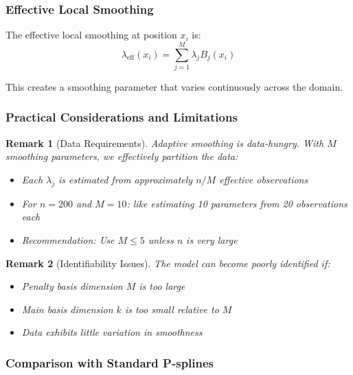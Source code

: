 \documentclass[12pt]{article}
\newtheorem{remark}{Remark}
\begin{document}
\subsubsection{Effective Local Smoothing}

The effective local smoothing at position $x_i$ is:
\begin{equation}
\lambda_{\text{eff}}(x_i) = \sum_{j=1}^M \lambda_j B_j(x_i)
\end{equation}

This creates a smoothing parameter that varies continuously across the domain.

\subsubsection{Practical Considerations and Limitations}

\begin{remark}[Data Requirements]
Adaptive smoothing is data-hungry. With $M$ smoothing parameters, we effectively partition the data:
\begin{itemize}
    \item Each $\lambda_j$ is estimated from approximately $n/M$ effective observations
    \item For $n=200$ and $M=10$: like estimating 10 parameters from 20 observations each
    \item Recommendation: Use $M \leq 5$ unless $n$ is very large
\end{itemize}
\end{remark}

\begin{remark}[Identifiability Issues]
The model can become poorly identified if:
\begin{itemize}
    \item Penalty basis dimension $M$ is too large
    \item Main basis dimension $k$ is too small relative to $M$
    \item Data exhibits little variation in smoothness
\end{itemize}
\end{remark}

\subsubsection{Comparison with Standard P-splines}
\end{document}
